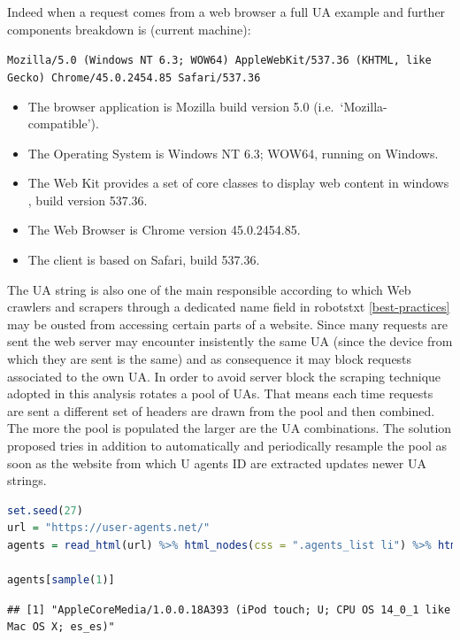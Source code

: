 \documentclass[
  12pt,
  a4paper,
  oneside]{book}
\newcommand{\passthrough}[1]{#1}
\providecommand{\tightlist}{%
  \setlength{\itemsep}{0pt}\setlength{\parskip}{0pt}}
\theoremstyle{definition}
\theoremstyle{definition}
\theoremstyle{definition}
\theoremstyle{remark}
\begin{document}
Indeed when a request comes from a web browser a full UA example and further components breakdown is (current machine):

\passthrough{\lstinline!Mozilla/5.0 (Windows NT 6.3; WOW64) AppleWebKit/537.36 (KHTML, like Gecko) Chrome/45.0.2454.85 Safari/537.36!}

\begin{itemize}
\tightlist
\item
  The browser application is Mozilla build version 5.0 (i.e.~`Mozilla-compatible').
\item
  The Operating System is Windows NT 6.3; WOW64, running on Windows.
\item
  The Web Kit provides a set of core classes to display web content in windows \citep{UserAgen23}, build version 537.36.
\item
  The Web Browser is Chrome version 45.0.2454.85.
\item
  The client is based on Safari, build 537.36.
\end{itemize}

The UA string is also one of the main responsible according to which Web crawlers and scrapers through a dedicated name field in robotstxt \ref{best-practices} may be ousted from accessing certain parts of a website. Since many requests are sent the web server may encounter insistently the same UA (since the device from which they are sent is the same) and as consequence it may block requests associated to the own UA. In order to avoid server block the scraping technique adopted in this analysis rotates a pool of UAs. That means each time requests are sent a different set of headers are drawn from the pool and then combined. The more the pool is populated the larger are the UA combinations. The solution proposed tries in addition to automatically and periodically resample the pool as soon as the website from which U agents ID are extracted updates newer UA strings.

\begin{lstlisting}[language=R]
set.seed(27)
url = "https://user-agents.net/"
agents = read_html(url) %>% html_nodes(css = ".agents_list li") %>% html_text()

agents[sample(1)]
\end{lstlisting}

\begin{lstlisting}
## [1] "AppleCoreMedia/1.0.0.18A393 (iPod touch; U; CPU OS 14_0_1 like Mac OS X; es_es)"
\end{lstlisting}
\end{document}
